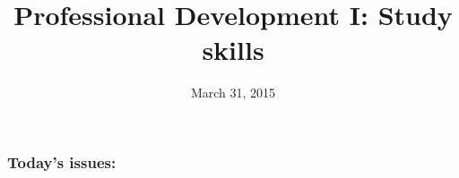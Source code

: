 


% 



\title[Professional Development I]{Professional Development I: Study skills}
\date{March 31, 2015}



\begin{noheadline}
\maketitle
\end{noheadline}


\begin{noheadline}
\begin{frame}
\frametitle{Today's issues:}
\tableofcontents[subsectionstyle=hide]
\end{frame}
\end{noheadline}

